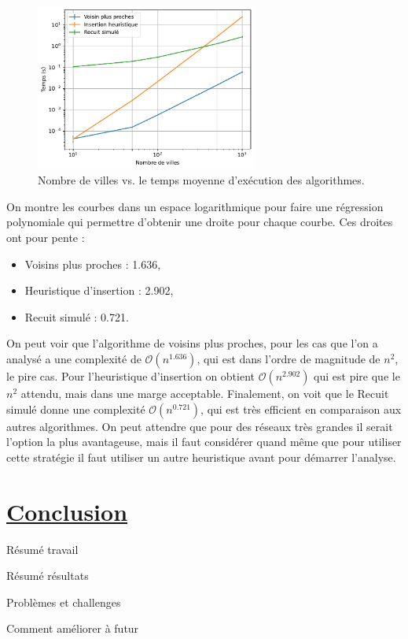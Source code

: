 \documentclass[a4paper,11pt,fleqn]{article}
\begin{document}
\begin{figure}[H]
    \centering
    \includegraphics[width=0.65\textwidth]{images/complexite_temporelle.pdf}
    \caption{Nombre de villes vs. le temps moyenne d'exécution des algorithmes.}
    \label{fig:temps}
\end{figure}

On montre les courbes dans un espace logarithmique pour faire une régression polynomiale qui permettre d'obtenir une droite pour chaque courbe. Ces droites ont pour pente :

\begin{itemize}
    \item Voisins plus proches : 1.636,
    \item Heuristique d'insertion : 2.902,
    \item Recuit simulé : 0.721.
\end{itemize}

On peut voir que l'algorithme de voisins plus proches, pour les cas que l'on a analysé a une complexité de $\mathcal{O}(n^{1.636})$, qui est dans l'ordre de magnitude de $n^2$, le pire cas. Pour l'heuristique d'insertion on obtient $\mathcal{O}(n^{2.902})$ qui est pire que le $n^2$ attendu, mais dans une marge acceptable. Finalement, on voit que le Recuit simulé donne une complexité $\mathcal{O}(n^{0.721})$, qui est très efficient en comparaison aux autres algorithmes. On peut attendre que pour des réseaux très grandes il serait l'option la plus avantageuse, mais il faut considérer quand même que pour utiliser cette stratégie il faut utiliser un autre heuristique avant pour démarrer l'analyse.

\newpage

\section*{\underline{Conclusion}}
Résumé travail

Résumé résultats

Problèmes et challenges

Comment améliorer à futur

\newpage


\end{document}
